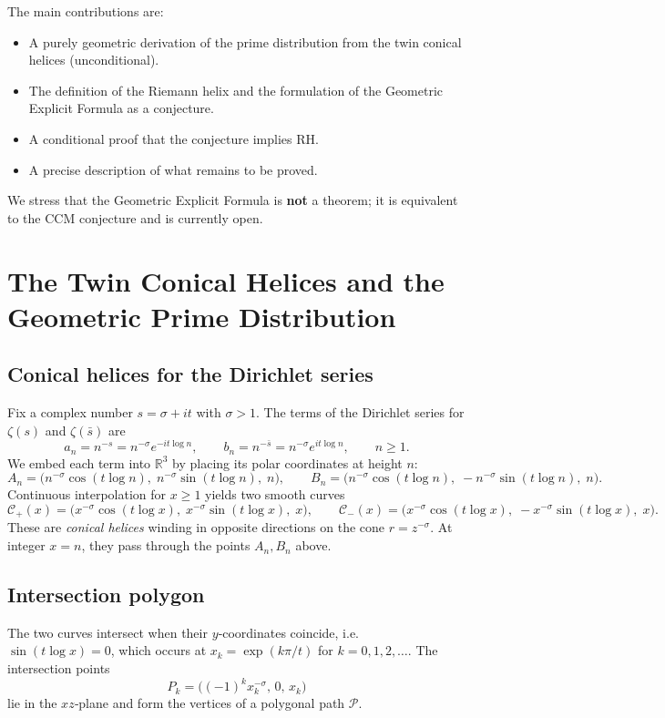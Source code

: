 \documentclass[12pt,a4paper]{article}
\newcommand{\R}{\mathbb{R}}
\begin{document}
The main contributions are:
\begin{itemize}
\item A purely geometric derivation of the prime distribution from the twin conical helices (unconditional).
\item The definition of the Riemann helix and the formulation of the Geometric Explicit Formula as a conjecture.
\item A conditional proof that the conjecture implies RH.
\item A precise description of what remains to be proved.
\end{itemize}
We stress that the Geometric Explicit Formula is \textbf{not} a theorem; it is equivalent to the CCM conjecture and is currently open.

\section{The Twin Conical Helices and the Geometric Prime Distribution}

\subsection{Conical helices for the Dirichlet series}
Fix a complex number $s = \sigma + i t$ with $\sigma > 1$.  The terms of the Dirichlet series for $\zeta(s)$ and $\zeta(\bar s)$ are
\[
a_n = n^{-s} = n^{-\sigma} e^{-i t \log n},\qquad
b_n = n^{-\bar s} = n^{-\sigma} e^{i t \log n},\qquad n\ge 1 .
\]
We embed each term into $\R^3$ by placing its polar coordinates at height $n$:
\[
A_n = \bigl( n^{-\sigma}\cos(t\log n),\; n^{-\sigma}\sin(t\log n),\; n \bigr),\qquad
B_n = \bigl( n^{-\sigma}\cos(t\log n),\; -n^{-\sigma}\sin(t\log n),\; n \bigr).
\]
Continuous interpolation for $x\ge 1$ yields two smooth curves
\begin{equation}\label{twin}
\mathcal{C}_+(x) = \bigl( x^{-\sigma}\cos(t\log x),\; x^{-\sigma}\sin(t\log x),\; x \bigr),\qquad
\mathcal{C}_-(x) = \bigl( x^{-\sigma}\cos(t\log x),\; -x^{-\sigma}\sin(t\log x),\; x \bigr).
\end{equation}
These are \emph{conical helices} winding in opposite directions on the cone $r = z^{-\sigma}$.  At integer $x=n$, they pass through the points $A_n, B_n$ above.

\subsection{Intersection polygon}
The two curves intersect when their $y$‑coordinates coincide, i.e.\ $\sin(t\log x)=0$, which occurs at $x_k = \exp(k\pi/t)$ for $k=0,1,2,\dots$.  The intersection points
\[
P_k = \bigl( (-1)^k x_k^{-\sigma},\, 0,\, x_k \bigr)
\]
lie in the $xz$‑plane and form the vertices of a polygonal path $\mathcal{P}$.
\end{document}
